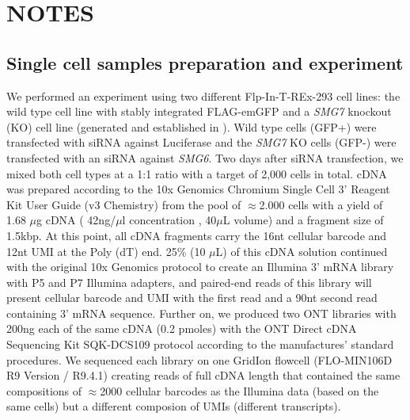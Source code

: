 \documentclass[times, 11pt, a4paper]{article}
\begin{document}
\section*{NOTES}
\subsection*{Single cell samples preparation and experiment}

We performed an experiment using two different Flp-In-T-REx-293 cell lines: the wild type cell line with stably integrated FLAG-emGFP and a \textit{SMG7} knockout (KO) cell line (generated and established in ). Wild type cells (GFP+) were transfected with siRNA against Luciferase and the \textit{SMG7} KO cells (GFP-) were transfected with an siRNA against \textit{SMG6}. Two days after siRNA transfection, we mixed both cell types at a 1:1 ratio with a target of 2,000 cells in total.
cDNA was prepared according to the 10x Genomics Chromium Single Cell 3' Reagent Kit User Guide (v3  Chemistry) from the pool of $\approx$2.000 cells with a yield of 1.68 $\mu$g cDNA ( 42ng/$\mu$l concentration , 40$\mu$L volume) and a fragment size of 1.5kbp. At this point, all cDNA fragments carry the 16nt cellular barcode and 12nt UMI at the Poly (dT) end. 25\% (10 $\mu$L) of this cDNA solution continued with the original 10x Genomics protocol to create an Illumina 3' mRNA library with P5 and P7 Illumina adapters, and paired-end reads of this library will present cellular barcode and UMI with the first read and a 90nt second read containing 3' mRNA sequence. Further on, we produced two ONT libraries with 200ng each of the same cDNA  (0.2 pmoles) with the ONT Direct cDNA Sequencing Kit SQK-DCS109 protocol according to the manufactures' standard procedures. We sequenced each library on one GridIon flowcell (FLO-MIN106D R9 Version / R9.4.1) creating reads of full cDNA length that contained the same compositions of $\approx$2000 cellular barcodes as the Illumina data (based on the same cells) but a different composion of UMIs (different transcripts).

\end{document}
